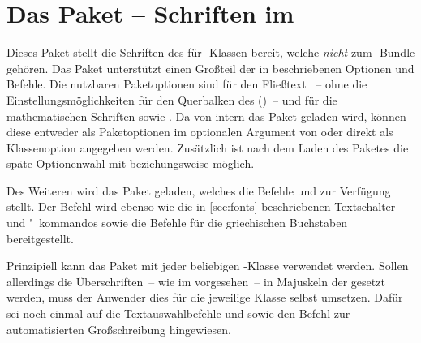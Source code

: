 \section{Das Paket  -- Schriften im \CD}
\begin{Declaration*}[v2.02]{}
\printchangedatlist
%
Dieses Paket stellt die Schriften des \CDs für -Klassen bereit, 
welche \emph{nicht} zum \TUDScript-Bundle gehören. Das Paket unterstützt einen 
Großteil der in  beschriebenen Optionen und Befehle. Die 
nutzbaren Paketoptionen sind für den Fließtext ~-- ohne die 
Einstellungsmöglichkeiten für den Querbalken des \CDs ()~-- und 
für die mathematischen Schriften  sowie . 
Da von  intern das Paket  geladen 
wird, können diese entweder als Paketoptionen im optionalen Argument von 
oder direkt als Klassenoption angegeben werden. Zusätzlich ist nach dem Laden 
des Paketes die späte Optionenwahl mit  beziehungsweise 
 möglich.

Des Weiteren wird das Paket  geladen, welches die Befehle 
 und  zur Verfügung stellt. Der 
Befehl  wird ebenso wie die in \autoref{sec:fonts} beschriebenen 
Textschalter und "~kommandos sowie die Befehle für die griechischen Buchstaben 
bereitgestellt.

Prinzipiell kann das Paket  mit jeder beliebigen 
-Klasse verwendet werden. Sollen allerdings die Überschriften~-- 
wie im \CD vorgesehen~-- in Majuskeln der \DIN gesetzt werden, muss der 
Anwender dies für die jeweilige Klasse selbst umsetzen. Dafür sei noch einmal 
auf die Textauswahlbefehle  und  sowie den Befehl 
 zur automatisierten Großschreibung hingewiesen.


\end{Declaration*}
